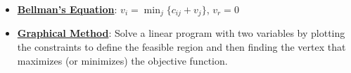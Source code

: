 \documentclass{article}%
\begin{document}
\begin{itemize}[leftmargin=*]%
\item \href{https://www.math.purdue.edu/~yipn/421//2024-11-14-NetAppls.pdf#page=17}{\textbf{Bellman's Equation}}: $v_i = \min_{j} \{c_{ij} + v_j\}$, $v_r = 0$%
\end{itemize}%
\begin{itemize}[leftmargin=*]%
\item \href{https://www.math.purdue.edu/~yipn/421//2024-12-03-Duality.pdf#page=3}{\textbf{Graphical Method}}: Solve a linear program with two variables by plotting the constraints to define the feasible region and then finding the vertex that maximizes (or minimizes) the objective function.%
\end{itemize}

%
\end{document}
